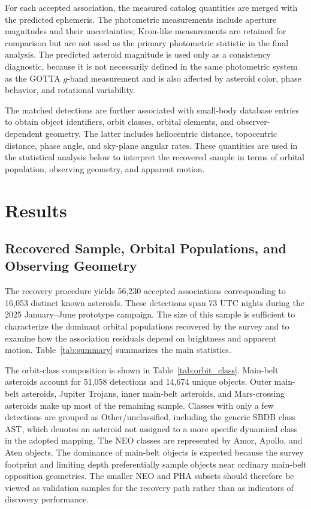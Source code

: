 \documentclass[referee]{raa}
\begin{document}
For each accepted association, the measured catalog quantities are merged with the predicted ephemeris. The photometric measurements include aperture magnitudes and their uncertainties; Kron-like measurements are retained for comparison but are not used as the primary photometric statistic in the final analysis. The predicted asteroid magnitude is used only as a consistency diagnostic, because it is not necessarily defined in the same photometric system as the GOTTA $g$-band measurement and is also affected by asteroid color, phase behavior, and rotational variability.

The matched detections are further associated with small-body database entries to obtain object identifiers, orbit classes, orbital elements, and observer-dependent geometry. The latter includes heliocentric distance, topocentric distance, phase angle, and sky-plane angular rates. These quantities are used in the statistical analysis below to interpret the recovered sample in terms of orbital population, observing geometry, and apparent motion.

\section{Results}
\label{sec:results}

\subsection{Recovered Sample, Orbital Populations, and Observing Geometry}

The recovery procedure yields 56,230 accepted associations corresponding to 16,053 distinct known asteroids. These detections span 73 UTC nights during the 2025 January--June prototype campaign. The size of this sample is sufficient to characterize the dominant orbital populations recovered by the survey and to examine how the association residuals depend on brightness and apparent motion. Table~\ref{tab:summary} summarizes the main statistics.



The orbit-class composition is shown in Table~\ref{tab:orbit_class}. Main-belt asteroids account for 51,058 detections and 14,674 unique objects. Outer main-belt asteroids, Jupiter Trojans, inner main-belt asteroids, and Mars-crossing asteroids make up most of the remaining sample. Classes with only a few detections are grouped as Other/unclassified, including the generic SBDB class AST, which denotes an asteroid not assigned to a more specific dynamical class in the adopted mapping. The NEO classes are represented by Amor, Apollo, and Aten objects. The dominance of main-belt objects is expected because the survey footprint and limiting depth preferentially sample objects near ordinary main-belt opposition geometries. The smaller NEO and PHA subsets should therefore be viewed as validation samples for the recovery path rather than as indicators of discovery performance.
\end{document}
